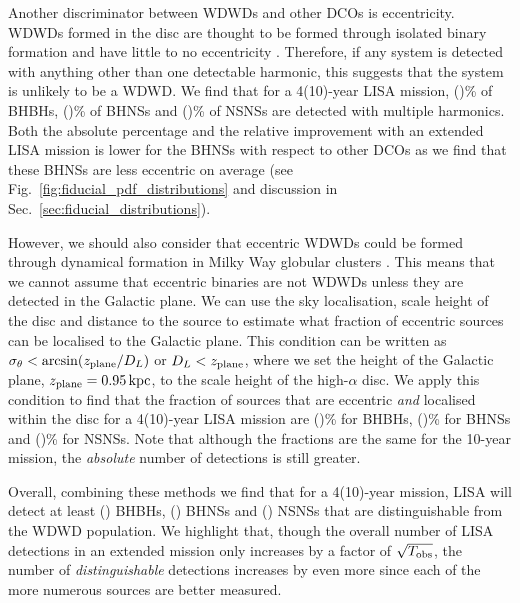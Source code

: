 Another discriminator between WDWDs and other DCOs is eccentricity. WDWDs formed in the disc are thought to be formed through isolated binary formation and have little to no eccentricity \citep[e.g.][]{Nelemans+2001}. Therefore, if any system is detected with anything other than one detectable harmonic, this suggests that the system is unlikely to be a WDWD. We find that for a 4(10)-year LISA mission, \BHBHMultipleHarmonicsFourPerc{}(\BHBHMultipleHarmonicsTenPerc{})\% of BHBHs, \BHNSMultipleHarmonicsFourPerc{}(\BHNSMultipleHarmonicsTenPerc{})\% of BHNSs and \NSNSMultipleHarmonicsFourPerc(\NSNSMultipleHarmonicsTenPerc{})\% of NSNSs are detected with multiple harmonics. Both the absolute percentage and the relative improvement with an extended LISA mission is lower for the BHNSs with respect to other DCOs as we find that these BHNSs are less eccentric on average (see Fig.~\ref{fig:fiducial_pdf_distributions} and discussion in Sec.~\ref{sec:fiducial_distributions}).

However, we should also consider that eccentric WDWDs could be formed through dynamical formation in Milky Way globular clusters \citep[e.g.][]{Willems+2007, Kremer+2018}. This means that we cannot assume that eccentric binaries are not WDWDs unless they are detected in the Galactic plane. We can use the sky localisation, scale height of the disc and distance to the source to estimate what fraction of eccentric sources can be localised to the Galactic plane. This condition can be written as $\sigma_\theta < \arcsin(z_{\rm plane} / D_L)$ or $D_L < z_{\rm plane}$, where we set the height of the Galactic plane, $z_{\rm plane}=0.95 \unit{kpc}$, to the scale height of the high-$\alpha$ disc. We apply this condition to find that the fraction of sources that are eccentric \textit{and} localised within the disc for a 4(10)-year LISA mission are \BHBHEccInDiscFourPerc{}(\BHBHEccInDiscTenPerc{})\% for BHBHs, \BHNSEccInDiscFourPerc{}(\BHNSEccInDiscTenPerc{})\% for BHNSs and \NSNSEccInDiscFourPerc{}(\NSNSEccInDiscTenPerc{})\% for NSNSs. Note that although the fractions are the same for the 10-year mission, the \textit{absolute} number of detections is still greater.

Overall, combining these methods we find that for a 4(10)-year mission, LISA will detect at least \BHBHNotWDWDFour{}(\BHBHNotWDWDTen{}) BHBHs, \BHNSNotWDWDFour{}(\BHNSNotWDWDTen{}) BHNSs and \NSNSNotWDWDFour{}(\NSNSNotWDWDTen{}) NSNSs that are distinguishable from the WDWD population. We highlight that, though the overall number of LISA detections in an extended mission only increases by a factor of $\sqrt{T_{\rm obs}}$, the number of \textit{distinguishable} detections increases by even more since each of the more numerous sources are better measured.


